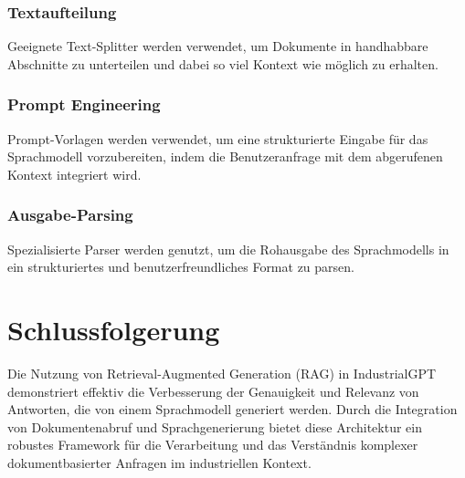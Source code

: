 \subsubsection{Textaufteilung}
Geeignete Text-Splitter werden verwendet, um Dokumente in handhabbare Abschnitte zu unterteilen und dabei so viel Kontext wie möglich zu erhalten.

\subsubsection{Prompt Engineering}
Prompt-Vorlagen werden verwendet, um eine strukturierte Eingabe für das Sprachmodell vorzubereiten, indem die Benutzeranfrage mit dem abgerufenen Kontext integriert wird.

\subsubsection{Ausgabe-Parsing}
Spezialisierte Parser werden genutzt, um die Rohausgabe des Sprachmodells in ein strukturiertes und benutzerfreundliches Format zu parsen.

\section{Schlussfolgerung}
Die Nutzung von Retrieval-Augmented Generation (RAG) in IndustrialGPT demonstriert effektiv die Verbesserung der Genauigkeit und Relevanz von Antworten, die von einem Sprachmodell generiert werden. Durch die Integration von Dokumentenabruf und Sprachgenerierung bietet diese Architektur ein robustes Framework für die Verarbeitung und das Verständnis komplexer dokumentbasierter Anfragen im industriellen Kontext.
